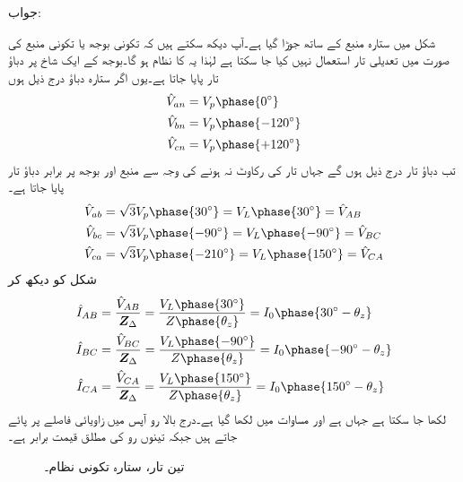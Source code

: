 جواب:

شکل  میں ستارہ منبع کے ساتھ  جوڑا گیا ہے۔آپ دیکھ سکتے ہیں کہ تکونی بوجھ یا تکونی منبع کی صورت میں تعدیلی تار استعمال نہیں کیا جا سکتا ہے لہٰذا یہ  کا نظام ہو گا۔بوجھ کے ایک شاخ پر دباؤ تار پایا جاتا ہے۔یوں اگر ستارہ دباؤ درج ذیل ہوں
\begin{align*}
\hat{V}_{an}&=V_p\phase{0^{\circ}}\\
\hat{V}_{bn}&=V_p\phase{-120^{\circ}}\\
\hat{V}_{cn}&=V_p\phase{+120^{\circ}}
\end{align*}
تب دباؤ تار درج ذیل ہوں گے جہاں تار کی رکاوٹ نہ ہونے کی وجہ سے منبع اور بوجھ پر برابر دباؤ تار پایا جاتا ہے۔
\begin{align*}
\hat{V}_{ab}&=\sqrt{3}V_p\phase{30^{\circ}}=V_L\phase{30^{\circ}}=\hat{V}_{AB}\\
\hat{V}_{bc}&=\sqrt{3}V_p\phase{-90^{\circ}}=V_L\phase{-90^{\circ}}=\hat{V}_{BC}\\
\hat{V}_{ca}&=\sqrt{3}V_p\phase{-210^{\circ}}=V_L\phase{150^{\circ}}=\hat{V}_{CA}
\end{align*}
شکل  کو دیکھ کر 
\begin{align*}
\hat{I}_{AB}&=\frac{\hat{V}_{AB}}{\bZ_{\Delta}}=\frac{V_L\phase{30^{\circ}}}{Z\phase{\theta_z}}=I_0\phase{30^{\circ}-\theta_z}\\
\hat{I}_{BC}&=\frac{\hat{V}_{BC}}{\bZ_{\Delta}}=\frac{V_L\phase{-90^{\circ}}}{Z\phase{\theta_z}}=I_0\phase{-90^{\circ}-\theta_z}\\
\hat{I}_{CA}&=\frac{\hat{V}_{CA}}{\bZ_{\Delta}}=\frac{V_L\phase{150^{\circ}}}{Z\phase{\theta_z}}=I_0\phase{150^{\circ}-\theta_z}
\end{align*}
لکھا جا سکتا ہے جہاں  ہے اور مساوات میں  لکھا گیا ہے۔درج بالا رو آپس میں  زاویائی فاصلے پر پائے جاتے ہیں جبکہ تینوں رو کی مطلق قیمت برابر ہے۔
\begin{figure}
\centering
{}
\caption{تین تار، ستارہ تکونی نظام۔}
\label{شکل_تین_دوری_ستارہ_تکونی_الف}
\end{figure}
